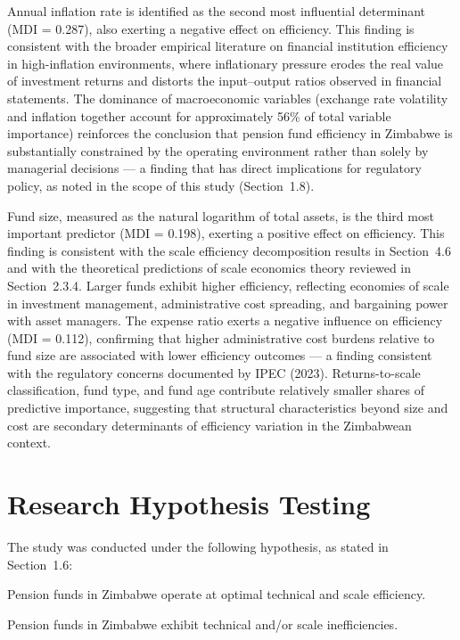 \documentclass[12pt,a4paper]{article}
\begin{document}
Annual inflation rate is identified as the second most influential determinant (MDI = 0.287), also exerting a negative effect on efficiency. This finding is consistent with the broader empirical literature on financial institution efficiency in high-inflation environments, where inflationary pressure erodes the real value of investment returns and distorts the input--output ratios observed in financial statements. The dominance of macroeconomic variables (exchange rate volatility and inflation together account for approximately 56\% of total variable importance) reinforces the conclusion that pension fund efficiency in Zimbabwe is substantially constrained by the operating environment rather than solely by managerial decisions --- a finding that has direct implications for regulatory policy, as noted in the scope of this study (Section~1.8).

Fund size, measured as the natural logarithm of total assets, is the third most important predictor (MDI = 0.198), exerting a positive effect on efficiency. This finding is consistent with the scale efficiency decomposition results in Section~4.6 and with the theoretical predictions of scale economics theory reviewed in Section~2.3.4. Larger funds exhibit higher efficiency, reflecting economies of scale in investment management, administrative cost spreading, and bargaining power with asset managers. The expense ratio exerts a negative influence on efficiency (MDI = 0.112), confirming that higher administrative cost burdens relative to fund size are associated with lower efficiency outcomes --- a finding consistent with the regulatory concerns documented by IPEC (2023). Returns-to-scale classification, fund type, and fund age contribute relatively smaller shares of predictive importance, suggesting that structural characteristics beyond size and cost are secondary determinants of efficiency variation in the Zimbabwean context.

\section{Research Hypothesis Testing}

The study was conducted under the following hypothesis, as stated in Section~1.6:

\begin{description}[noitemsep]
    \item[$H_0$:] Pension funds in Zimbabwe operate at optimal technical and scale efficiency.
    \item[$H_1$:] Pension funds in Zimbabwe exhibit technical and/or scale inefficiencies.
\end{description}
\end{document}
